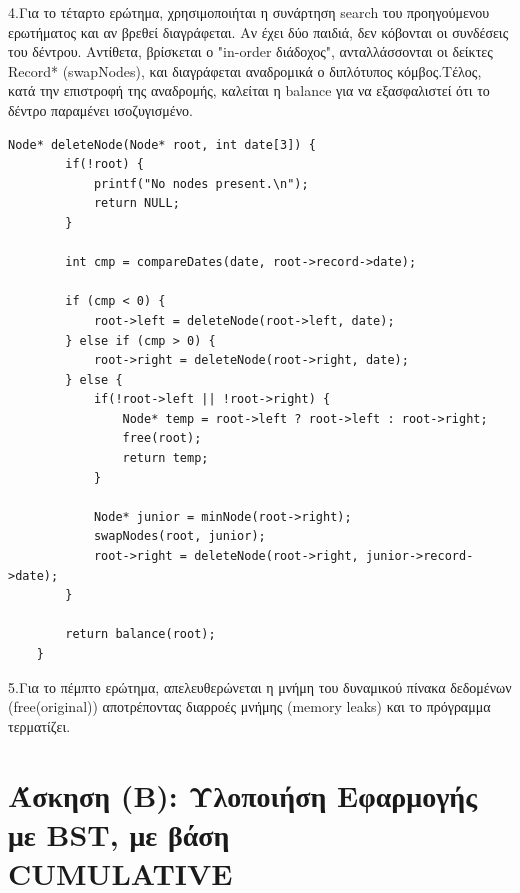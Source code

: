 \documentclass[a4paper,12pt]{article}
\begin{document}
4.Για το τέταρτο ερώτημα, χρησιμοποιήται η συνάρτηση search του προηγούμενου ερωτήματος και αν βρεθεί διαγράφεται. Αν έχει δύο παιδιά, δεν κόβονται οι συνδέσεις του δέντρου. Αντίθετα, βρίσκεται ο "in-order διάδοχος", ανταλλάσσονται οι δείκτες Record* (swapNodes), και διαγράφεται αναδρομικά ο διπλότυπος κόμβος.Τέλος, κατά την επιστροφή της αναδρομής, καλείται η balance για να εξασφαλιστεί ότι το δέντρο παραμένει ισοζυγισμένο.\\
\begin{lstlisting}[caption={Συνάρτηση deleteNode}]
	Node* deleteNode(Node* root, int date[3]) {
		if(!root) {
			printf("No nodes present.\n");
			return NULL;
		}
		
		int cmp = compareDates(date, root->record->date);
		
		if (cmp < 0) {
			root->left = deleteNode(root->left, date);
		} else if (cmp > 0) {
			root->right = deleteNode(root->right, date);
		} else {
			if(!root->left || !root->right) {
				Node* temp = root->left ? root->left : root->right;
				free(root);
				return temp;
			}
			
			Node* junior = minNode(root->right);
			swapNodes(root, junior);
			root->right = deleteNode(root->right, junior->record->date);
		}
		
		return balance(root);
	}
\end{lstlisting}
5.Για το πέμπτο ερώτημα, απελευθερώνεται η μνήμη του δυναμικού πίνακα δεδομένων (free(original)) αποτρέποντας διαρροές μνήμης (memory leaks) και το πρόγραμμα τερματίζει.

\section{Άσκηση (Β): Υλοποιήση Εφαρμογής με BST, με βάση\\CUMULATIVE}
\end{document}
